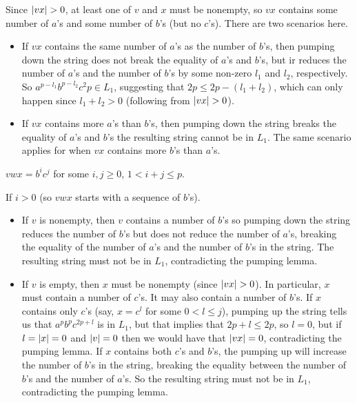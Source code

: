 \begin{problem}
\begin{enumalph}
\begin{Answer}
\begin{enumroman}
          \step
          Since $\lvert vx\rvert > 0$, at least one of $v$ and $x$ must be nonempty,
          so $vx$ contains some number of $a$'s and some number of $b$'s
          (but no $c$'s).
          There are two scenarios here.
          \begin{itemize}
            \item If $vx$ contains the same number of $a$'s as the number of $b$'s,
              then pumping down the string does not break the equality of $a$'s
              and $b$'s, but ir reduces the number of $a$'s and the number of $b$'s
              by some non-zero $l_1$ and $l_2$, respectively.
              So $a^{p-l_1}b^{p-l_2}c^2p \in L_1$,
              suggesting that $2p \leq 2p - (l_1 + l_2)$, which can only happen
              since $l_1 + l_2 > 0$ (following from $\lvert vx\rvert > 0$).
            \item If $vx$ contains more $a$'s than $b$'s, then pumping down the string
              breaks the equality of $a$'s and $b$'s the resulting string cannot
              be in $L_1$. The same scenario applies for when $vx$ contains more
              $b$'s than $a$'s.
          \end{itemize}
        \item $vwx = b^ic^j$ for some $i, j \geq 0$, $1 < i + j \leq p$.
        
        If $i > 0$ (so $vwx$ starts with a sequence of $b$'s).
        \begin{itemize}
          \item If $v$ is nonempty, then $v$ contains a number of $b$'s
            so pumping down the string reduces the number of $b$'s
            but does not reduce the number of $a$'s,
            breaking the equality of the number of $a$'s and the number of $b$'s
            in the string. The resulting string must not be in $L_1$,
            contradicting the pumping lemma.
          \item If $v$ is empty, then $x$ must be nonempty (since $\lvert vx\rvert > 0$).
            In particular, $x$ must contain a number of $c$'s. It may also contain
            a number of $b$'s.
            If $x$ contains only $c$'s (say, $x = c^l$ for some $0 < l \leq j$),
            pumping up the string tells us that $a^pb^pc^{2p+l}$
            is in $L_1$, but that implies that $2p + l \leq 2p$,
            so $l = 0$, but if $l = \lvert x\rvert = 0$ and $\lvert v\rvert = 0$
            then we would have that $\lvert vx\rvert = 0$, contradicting the pumping lemma.
            If $x$ contains both $c$'s and $b$'s, the pumping up will increase the number
            of $b$'s in the string, breaking the equality between the number of $b$'s
            and the number of $a$'s. So the resulting string must not be in $L_1$,
            contradicting the pumping lemma.
        \end{itemize}


\end{enumroman}
\end{Answer}
\end{enumalph}
\end{problem}
